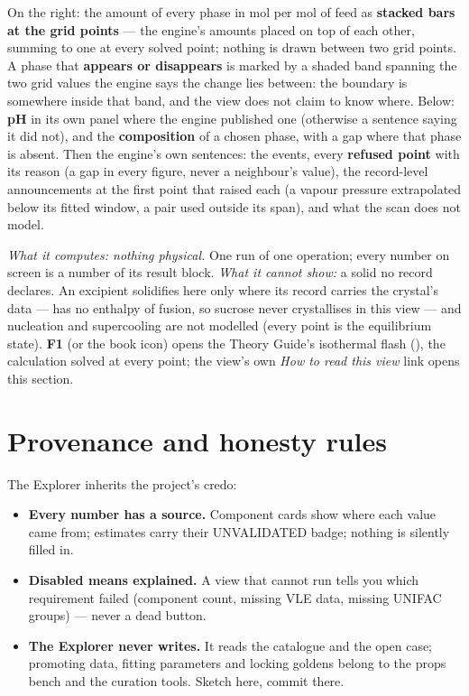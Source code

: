\documentclass[11pt,a4paper]{article}
\begin{document}
On the right: the amount of every phase in mol per mol of feed as
\textbf{stacked bars at the grid points} --- the engine's amounts placed on
top of each other, summing to one at every solved point; nothing is drawn
between two grid points.  A phase that \textbf{appears or disappears} is
marked by a shaded band spanning the two grid values the engine says the
change lies between: the boundary is somewhere inside that band, and the
view does not claim to know where.  Below: \textbf{pH} in its own panel where
the engine published one (otherwise a sentence saying it did not), and the
\textbf{composition} of a chosen phase, with a gap where that phase is
absent.  Then the engine's own sentences: the events, every
\textbf{refused point} with its reason (a gap in every figure, never a
neighbour's value), the record-level announcements at the first point that
raised each (a vapour pressure extrapolated below its fitted window, a pair
used outside its span), and what the scan does not model.

\emph{What it computes: nothing physical.}  One  run of
one  operation; every number on screen is a number of
its  result block.  \emph{What it cannot show:} a
solid no record declares.  An excipient solidifies here only where its
record carries the crystal's data ---  has no enthalpy of
fusion, so sucrose never crystallises in this view --- and nucleation and
supercooling are not modelled (every point is the equilibrium state).
\textbf{F1} (or the book icon) opens the Theory Guide's isothermal flash
(), the calculation solved at every point; the view's own
\emph{How to read this view} link opens this section.

\section{Provenance and honesty rules}

The Explorer inherits the project's credo:
\begin{itemize}[leftmargin=*,nosep]
  \item \textbf{Every number has a source.}  Component cards show where each
        value came from; estimates carry their UNVALIDATED badge; nothing is
        silently filled in.
  \item \textbf{Disabled means explained.}  A view that cannot run tells you
        which requirement failed (component count, missing VLE data, missing
        UNIFAC groups) --- never a dead button.
  \item \textbf{The Explorer never writes.}  It reads the catalogue and the
        open case; promoting data, fitting parameters and locking goldens
        belong to the props bench and the curation tools.  Sketch here,
        commit there.
\end{itemize}
\end{document}
